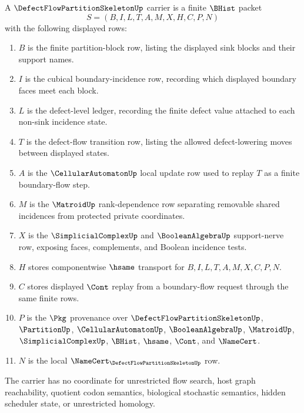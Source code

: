 \begin{definition}
\label{def:defect-flow-partition-skeleton-carrier}
A $\DefectFlowPartitionSkeletonUp$ carrier is a finite $\BHist$ packet
$$
S=(B,I,L,T,A,M,X,H,C,P,N)
$$
with the following displayed rows:
\begin{enumerate}
\item $B$ is the finite partition-block row, listing the displayed sink blocks and their support names.
\item $I$ is the cubical boundary-incidence row, recording which displayed boundary faces meet each block.
\item $L$ is the defect-level ledger, recording the finite defect value attached to each non-sink incidence state.
\item $T$ is the defect-flow transition row, listing the allowed defect-lowering moves between displayed states.
\item $A$ is the $\CellularAutomatonUp$ local update row used to replay $T$ as a finite boundary-flow step.
\item $M$ is the $\MatroidUp$ rank-dependence row separating removable shared incidences from protected private coordinates.
\item $X$ is the $\SimplicialComplexUp$ and $\BooleanAlgebraUp$ support-nerve row, exposing faces, complements, and Boolean incidence tests.
\item $H$ stores componentwise $\hsame$ transport for $B,I,L,T,A,M,X,C,P,N$.
\item $C$ stores displayed $\Cont$ replay from a boundary-flow request through the same finite rows.
\item $P$ is the $\Pkg$ provenance over $\DefectFlowPartitionSkeletonUp$, $\PartitionUp$, $\CellularAutomatonUp$, $\BooleanAlgebraUp$, $\MatroidUp$, $\SimplicialComplexUp$, $\BHist$, $\hsame$, $\Cont$, and $\NameCert$.
\item $N$ is the local $\NameCert_{\DefectFlowPartitionSkeletonUp}$ row.
\end{enumerate}
The carrier has no coordinate for unrestricted flow search, host graph reachability, quotient codon semantics, biological stochastic semantics, hidden scheduler state, or unrestricted homology.
\end{definition}

